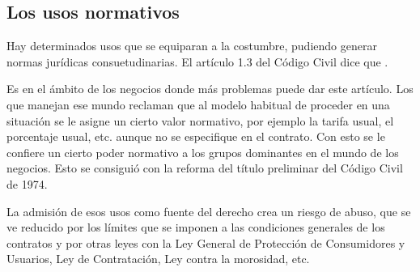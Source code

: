 \documentclass[a4paper,12pt]{report}
\begin{document}
\subsection{Los usos normativos}

Hay determinados usos que se equiparan a la costumbre, pudiendo generar normas jurídicas consuetudinarias. El artículo 1.3 del Código Civil dice que .

Es en el ámbito de los negocios donde más problemas puede dar este artículo. Los que manejan ese mundo reclaman que al modelo habitual de proceder en una situación se le asigne un cierto valor normativo, por ejemplo la tarifa usual, el porcentaje usual, etc. aunque no se especifique en el contrato. Con esto se le confiere un cierto poder normativo a los grupos dominantes en el mundo de los negocios. Esto se consiguió con la reforma del título preliminar del Código Civil de 1974.

La admisión de esos usos como fuente del derecho crea un riesgo de abuso, que se ve reducido por los límites que se imponen a las condiciones generales de los contratos y por otras leyes con la Ley General de Protección de Consumidores y Usuarios, Ley de Contratación, Ley contra la morosidad, etc.
\end{document}

